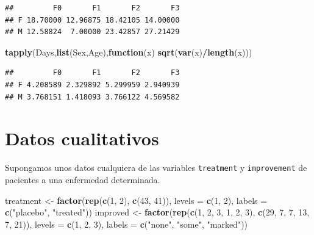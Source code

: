\documentclass[]{book}
\newenvironment{Shaded}{\begin{snugshade}}{\end{snugshade}}
\newcommand{\KeywordTok}[1]{\textcolor[rgb]{0.13,0.29,0.53}{\textbf{#1}}}
\newcommand{\DataTypeTok}[1]{\textcolor[rgb]{0.13,0.29,0.53}{#1}}
\newcommand{\DecValTok}[1]{\textcolor[rgb]{0.00,0.00,0.81}{#1}}
\newcommand{\StringTok}[1]{\textcolor[rgb]{0.31,0.60,0.02}{#1}}
\newcommand{\ControlFlowTok}[1]{\textcolor[rgb]{0.13,0.29,0.53}{\textbf{#1}}}
\newcommand{\OperatorTok}[1]{\textcolor[rgb]{0.81,0.36,0.00}{\textbf{#1}}}
\newcommand{\NormalTok}[1]{#1}
\begin{document}
\begin{verbatim}
##         F0       F1       F2       F3
## F 18.70000 12.96875 18.42105 14.00000
## M 12.58824  7.00000 23.42857 27.21429
\end{verbatim}

\begin{Shaded}
\begin{Highlighting}[]
\KeywordTok{tapply}\NormalTok{(Days,}\KeywordTok{list}\NormalTok{(Sex,Age),}\ControlFlowTok{function}\NormalTok{(x) }\KeywordTok{sqrt}\NormalTok{(}\KeywordTok{var}\NormalTok{(x)}\OperatorTok{/}\KeywordTok{length}\NormalTok{(x)))}
\end{Highlighting}
\end{Shaded}

\begin{verbatim}
##         F0       F1       F2       F3
## F 4.208589 2.329892 5.299959 2.940939
## M 3.768151 1.418093 3.766122 4.569582
\end{verbatim}

\section{Datos cualitativos}\label{datos-cualitativos}

Supongamos unos datos cualquiera de las variables \texttt{treatment} y
\texttt{improvement} de pacientes a una enfermedad determinada.

\begin{Shaded}
\begin{Highlighting}[]
\NormalTok{treatment <-}\StringTok{ }\KeywordTok{factor}\NormalTok{(}\KeywordTok{rep}\NormalTok{(}\KeywordTok{c}\NormalTok{(}\DecValTok{1}\NormalTok{, }\DecValTok{2}\NormalTok{), }\KeywordTok{c}\NormalTok{(}\DecValTok{43}\NormalTok{, }\DecValTok{41}\NormalTok{)), }\DataTypeTok{levels =} \KeywordTok{c}\NormalTok{(}\DecValTok{1}\NormalTok{, }\DecValTok{2}\NormalTok{),}
                    \DataTypeTok{labels =} \KeywordTok{c}\NormalTok{(}\StringTok{"placebo"}\NormalTok{, }\StringTok{"treated"}\NormalTok{))}
\NormalTok{improved <-}\StringTok{ }\KeywordTok{factor}\NormalTok{(}\KeywordTok{rep}\NormalTok{(}\KeywordTok{c}\NormalTok{(}\DecValTok{1}\NormalTok{, }\DecValTok{2}\NormalTok{, }\DecValTok{3}\NormalTok{, }\DecValTok{1}\NormalTok{, }\DecValTok{2}\NormalTok{, }\DecValTok{3}\NormalTok{), }\KeywordTok{c}\NormalTok{(}\DecValTok{29}\NormalTok{, }\DecValTok{7}\NormalTok{, }\DecValTok{7}\NormalTok{, }\DecValTok{13}\NormalTok{, }\DecValTok{7}\NormalTok{, }\DecValTok{21}\NormalTok{)),}
                   \DataTypeTok{levels =} \KeywordTok{c}\NormalTok{(}\DecValTok{1}\NormalTok{, }\DecValTok{2}\NormalTok{, }\DecValTok{3}\NormalTok{),}
                   \DataTypeTok{labels =} \KeywordTok{c}\NormalTok{(}\StringTok{"none"}\NormalTok{, }\StringTok{"some"}\NormalTok{, }\StringTok{"marked"}\NormalTok{))}
\end{Highlighting}
\end{Shaded}
\end{document}
